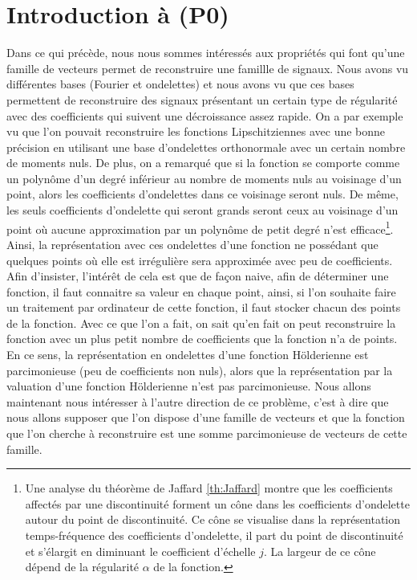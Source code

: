 \section{Introduction à (P0)}
Dans ce qui précède, nous nous sommes intéressés aux propriétés qui font qu'une famille de vecteurs permet de reconstruire une famillle de signaux.
Nous avons vu différentes bases (Fourier et ondelettes) et nous avons vu que ces bases permettent de reconstruire des signaux présentant un certain type de régularité avec des coefficients qui suivent une décroissance assez rapide.
\newline
On a par exemple vu que l'on pouvait reconstruire les fonctions Lipschitziennes avec une bonne précision en utilisant une base d'ondelettes orthonormale avec un certain nombre de moments nuls.
De plus, on a remarqué que si la fonction se comporte comme un polynôme d'un degré inférieur au nombre de moments nuls au voisinage d'un point, alors les coefficients d'ondelettes dans ce voisinage seront nuls.
De même, les seuls coefficients d'ondelette qui seront grands seront ceux au voisinage d'un point où aucune approximation par un polynôme de petit degré n'est efficace\footnote{Une analyse du théorème de Jaffard \ref{th:Jaffard} montre que les coefficients affectés par une discontinuité forment un cône dans les coefficients d'ondelette autour du point de discontinuité. Ce cône se visualise dans la représentation temps-fréquence des coefficients d'ondelette, il part du point de discontinuité et s'élargit en diminuant le coefficient d'échelle $j$. La largeur de ce cône dépend de la régularité $\alpha$ de la fonction.}.
Ainsi, la représentation avec ces ondelettes d'une fonction ne possédant que quelques points où elle est irrégulière sera approximée avec peu de coefficients.
Afin d'insister, l'intérêt de cela est que de façon naive, afin de déterminer une fonction, il faut connaitre sa valeur en chaque point, ainsi, si l'on souhaite faire un traitement par ordinateur de cette fonction, il faut stocker chacun des points de la fonction.
Avec ce que l'on a fait, on sait qu'en fait on peut reconstruire la fonction avec un plus petit nombre de coefficients que la fonction n'a de points.
En ce sens, la représentation en ondelettes d'une fonction Hölderienne est parcimonieuse (peu de coefficients non nuls), alors que la représentation par la valuation d'une fonction Hölderienne n'est pas parcimonieuse.
\newline
Nous allons maintenant nous intéresser à l'autre direction de ce problème, c'est à dire que nous allons supposer que l'on dispose d'une famille de vecteurs et que la fonction que l'on cherche à reconstruire est une somme parcimonieuse de vecteurs de cette famille.
